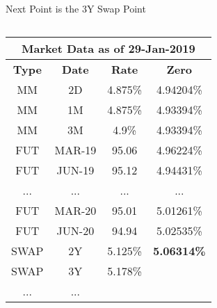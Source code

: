 \documentclass[handout, aspectratio=169]{beamer}
\begin{document}
\begin{frame}{Next Point is the 3Y Swap Point}
	\begin{columns}[T]
		\begin{column}{0.3\textwidth}
			\begin{table}[t]
				\centering
				\begin{adjustbox}{max width=\textwidth, max height=0.175\textheight}
					\begin{tabular}{|c|c|c|c|} 
						\hline
						\multicolumn{4}{|c|}{\textbf{Market Data as of 29-Jan-2019}} \\
						\hline
						\textbf{Type} & \textbf{Date}  & \textbf{Rate} & \textbf{Zero}\\				
						\hline
						MM & 2D & 4.875\% & 4.94204\% \\
						MM & 1M & 4.875\% & 4.93394\% \\
						MM & 3M & 4.9\% & 4.93394\% \\
						\hline
						FUT & MAR-19 & 95.06 & 4.96224\% \\
						FUT & JUN-19 & 95.12 & 4.94431\% \\
						... & ... & ... & ... \\
						FUT & MAR-20 & 95.01 & 5.01261\% \\
						FUT & JUN-20 & 94.94 & 5.02535\% \\
						\hline
						SWAP & 2Y & 5.125\% & \textbf{5.06314\%}\\
						SWAP & 3Y & 5.178\% &\\
						... & ... & &\\
						\hline
					\end{tabular}
				\end{adjustbox}
			\end{table}
			\vspace{-0.5cm}
\end{column}
\end{columns}
\end{frame}
\end{document}

